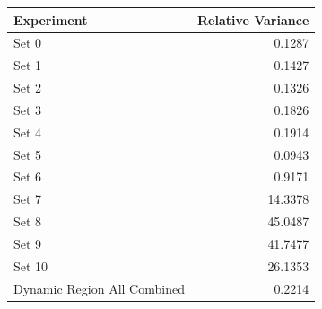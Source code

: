 \begin{tabular}{lr}
\toprule
Experiment & Relative Variance \\
\midrule
Set 0 & 0.1287 \\
Set 1 & 0.1427 \\
Set 2 & 0.1326 \\
Set 3 & 0.1826 \\
Set 4 & 0.1914 \\
Set 5 & 0.0943 \\
Set 6 & 0.9171 \\
Set 7 & 14.3378 \\
Set 8 & 45.0487 \\
Set 9 & 41.7477 \\
Set 10 & 26.1353 \\
Dynamic Region All Combined & 0.2214 \\
\bottomrule
\end{tabular}
